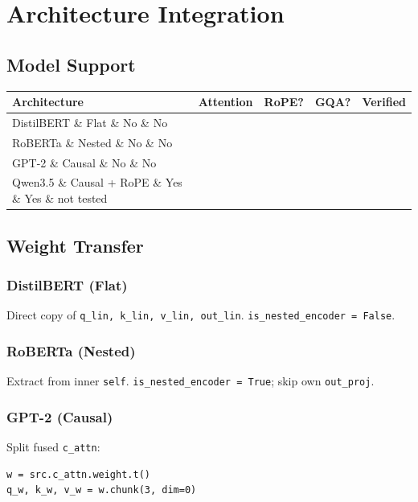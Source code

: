 
\section{Architecture Integration}

\subsection{Model Support}

\begin{table}[H]
\centering
\small
\begin{tabular}{lllll}
\toprule
\textbf{Architecture} & \textbf{Attention} & \textbf{RoPE?} & \textbf{GQA?} & \textbf{Verified} \\
\midrule
DistilBERT \& Flat \& No \& No &  \\
RoBERTa \& Nested \& No \& No &  \\
GPT-2 \& Causal \& No \& No &  \\
Qwen3.5 \& Causal + RoPE \& Yes \& Yes \& not tested \\
\bottomrule
\end{tabular}
\end{table}

\subsection{Weight Transfer}

\subsubsection{DistilBERT (Flat)}

Direct copy of \texttt{q\_lin, k\_lin, v\_lin, out\_lin}. \texttt{is\_nested\_encoder = False}.

\subsubsection{RoBERTa (Nested)}

Extract from inner \texttt{self}. \texttt{is\_nested\_encoder = True}; skip own \texttt{out\_proj}.

\subsubsection{GPT-2 (Causal)}

Split fused \texttt{c\_attn}:

\begin{lstlisting}
w = src.c_attn.weight.t()
q_w, k_w, v_w = w.chunk(3, dim=0)
\end{lstlisting}

